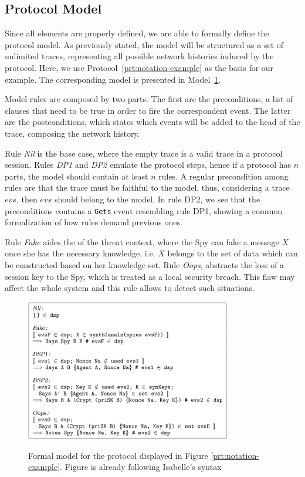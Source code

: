 \subsection{Protocol Model}
Since all elements are properly defined, we are able to formally define the protocol model. As previously stated, the model will be structured as a set of unlimited traces, representing all possible network histories induced by the protocol. Here, we use Protocol~\ref{prt:notation-example} as the basis for our example. The corresponding model is presented in Model~\ref{fig:notation-example-model}.

Model rules are composed by two parts. The first are the preconditions, a list of clauses that need to be true in order to fire the correspondent event. The latter are the postconditions, which states which events will be added to the head of the trace, composing the network history.

Rule \textit{Nil} is the base case, where the empty trace is a valid trace in a protocol session. Rules \textit{DP1} and \textit{DP2} emulate the protocol steps, hence if a protocol has $n$ parts, the model should contain at least $n$ rules. A regular precondition among rules are that the trace must be faithful to the model, thus, considering a trace $evs$, then $evs$ should belong to the model. In rule DP2, we see that the preconditions contains a \texttt{Gets} event resembling rule DP1, showing a common formalization of how rules demand previous ones.

Rule \textit{Fake} aides the of the threat context, where the Spy can fake a message $X$ once she has the necessary knowledge, i.e. $X$ belongs to the set of data which can be constructed based on her knowledge set. Rule \textit{Oops}, abstracts the loss of a session key to the Spy, which is treated as a local security breach. This flaw may affect the whole system and this rule allows to detect such situations.

\begin{figure}
  \centering
  \includegraphics[width=0.8\textwidth]{img/prt-example-model}
  \label{fig:notation-example-model}
  \caption{Formal model for the protocol displayed in Figure \ref{prt:notation-example}. Figure is already following Isabelle's syntax}
\end{figure}

